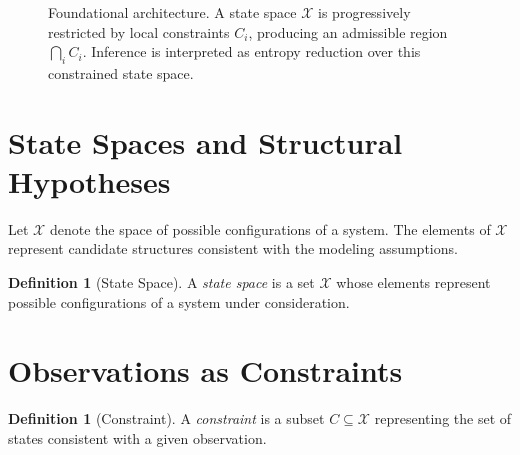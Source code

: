 \documentclass[12pt,a4paper,oneside]{book}
\numberwithin{equation}{chapter}
\theoremstyle{plain}
\theoremstyle{definition}
\newtheorem{definition}[theorem]{Definition}
\theoremstyle{remark}
\begin{document}
\begin{figure}[htbp]
\centering
{}
\caption{Foundational architecture. A state space $\mathcal{X}$ is
progressively restricted by local constraints $C_i$, producing an
admissible region $\bigcap_i C_i$. Inference is interpreted as
entropy reduction over this constrained state space.}
\label{fig:foundational-constraint-architecture}
\end{figure}

\section{State Spaces and Structural Hypotheses}

Let $\mathcal{X}$ denote the space of possible configurations of a
system. The elements of $\mathcal{X}$ represent candidate structures
consistent with the modeling assumptions.

\begin{definition}[State Space]
A \emph{state space} is a set $\mathcal{X}$ whose elements represent
possible configurations of a system under consideration.
\end{definition}

\section{Observations as Constraints}

\begin{definition}[Constraint]
A \emph{constraint} is a subset $C \subseteq \mathcal{X}$ representing
the set of states consistent with a given observation.
\end{definition}
\end{document}
